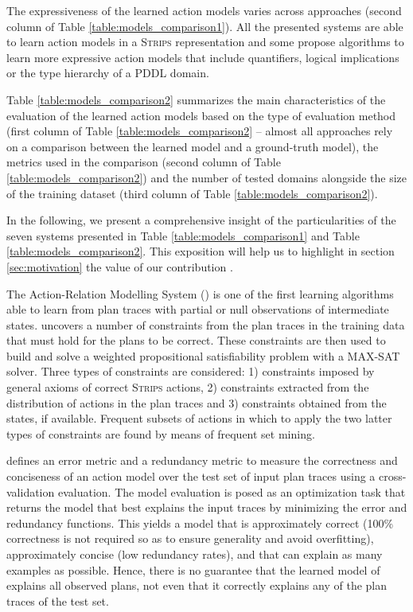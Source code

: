 The expressiveness of the learned action models varies across approaches (second column of Table \ref{table:models_comparison1}). All the presented systems are able to learn action models in a \textsc{Strips}  representation \cite{fikes1971strips} and some propose algorithms to learn more expressive action models that include quantifiers, logical implications or the type hierarchy of a PDDL domain.

Table \ref{table:models_comparison2} summarizes the main characteristics of the evaluation of the learned action models based on the type of evaluation method (first column of Table \ref{table:models_comparison2} -- almost all approaches rely on a comparison between the learned model and a ground-truth model), the metrics used in the comparison (second column of Table \ref{table:models_comparison2}) and the number of tested domains alongside the size of the training dataset (third column of Table \ref{table:models_comparison2}).

In the following, we present a comprehensive insight of the particularities of the seven systems presented in Table \ref{table:models_comparison1} and Table \ref{table:models_comparison2}. This exposition will help us to highlight in section \ref{sec:motivation} the value of our contribution \FAMA.


\vspace{0.3cm}

The Action-Relation Modelling System (\textbf{\ARMS}) \cite{yang2007learning} is one of the first learning algorithms able to learn from plan traces with partial or null observations of intermediate states. \ARMS uncovers a number of constraints from the plan traces in the training data that must hold for the plans to be correct. These constraints are then used to build and solve a weighted propositional satisfiability problem with a MAX-SAT solver. Three types of constraints are considered: 1) constraints imposed by general axioms of correct \textsc{Strips} actions, 2) constraints extracted from the distribution of actions in the plan traces and 3) constraints obtained from the \PO states, if available. Frequent subsets of actions in which to apply the two latter types of constraints are found by means of frequent set mining.

\ARMS defines an error metric and a redundancy metric to measure the correctness and conciseness of an action model over the test set of input plan traces using a cross-validation evaluation. The model evaluation is posed as an optimization task that returns the model that best explains the input traces by minimizing the error and redundancy functions. This yields a model that is approximately correct (100\% correctness is not required so as to ensure generality and avoid overfitting), approximately concise (low redundancy rates), and that can explain as many examples as possible. Hence, there is no guarantee that the learned model of \ARMS explains all observed plans, not even that it correctly explains any of the plan traces of the test set.

